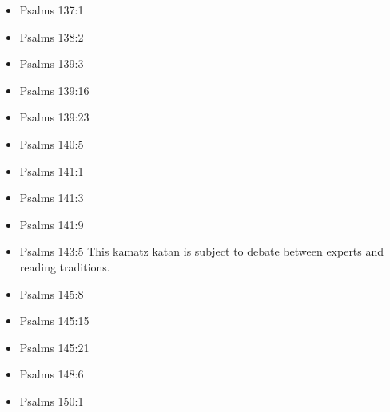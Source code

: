 \documentclass[14pt]{article}
\begin{document}
\begin{multicols}{2}
\begin{itemize}
							\item Psalms 137:1
							
							\item Psalms 138:2
							
							\item Psalms 139:3
							
							\item Psalms 139:16
							
							\item Psalms 139:23
							
							\item Psalms 140:5
							
							\item Psalms 141:1
							
							\item Psalms 141:3
							
							\item Psalms 141:9
							
							\item Psalms 143:5 This kamatz katan is subject to debate between experts and reading traditions.
							
							\item Psalms 145:8
							
							\item Psalms 145:15
							
							\item Psalms 145:21
							
							\item Psalms 148:6
							
							\item Psalms 150:1
									
							\end{itemize}\end{multicols}
						
\end{document}
